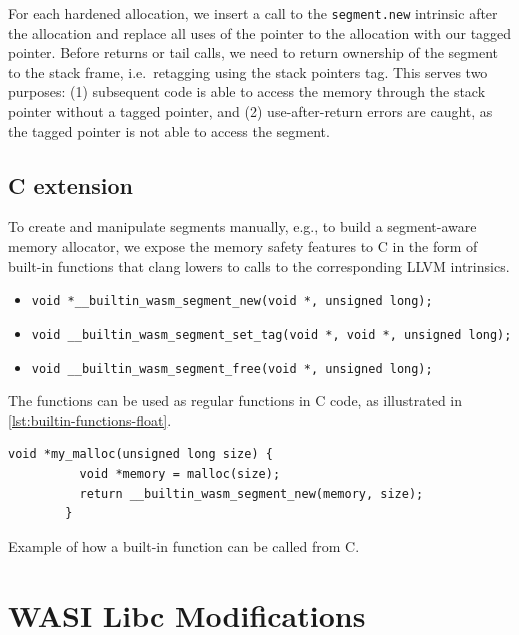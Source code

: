 For each hardened allocation, we insert a call to the \texttt{segment.new} intrinsic after the allocation and replace all uses of the pointer to the allocation with our tagged pointer.
Before returns or tail calls, we need to return ownership of the segment to the stack frame, i.e.\ retagging using the stack pointers tag.
This serves two purposes: (1) subsequent code is able to access the memory through the stack pointer without a tagged pointer, and (2) use-after-return errors are caught, as the tagged pointer is not able to access the segment.

\subsection{C extension}
\label{subsec:c-extension}

To create and manipulate segments manually, e.g., to build a segment-aware memory allocator, we expose the memory safety features to C in the form of built-in functions that clang lowers to calls to the corresponding LLVM intrinsics.

\begin{itemize}
    \item[] \lstinline[style=customc]{void *__builtin_wasm_segment_new(void *, unsigned long);}
    \item[] \lstinline[style=customc]{void __builtin_wasm_segment_set_tag(void *, void *, unsigned long);}
    \item[] \lstinline[style=customc]{void __builtin_wasm_segment_free(void *, unsigned long);}
\end{itemize}

\noindent
The functions can be used as regular functions in C code, as illustrated in \cref{lst:builtin-functions-float}.

\begin{lstfloat}
    \begin{lstlisting}[frame=h,style=customc,
        label={lst:builtin-functions}]
        void *my_malloc(unsigned long size) {
          void *memory = malloc(size);
          return __builtin_wasm_segment_new(memory, size);
        }
    \end{lstlisting}
    \caption{Example of how a built-in function can be called from C.}
    \label{lst:builtin-functions-float}
\end{lstfloat}


\section{WASI Libc Modifications}
\label{sec:wasi-libc}

